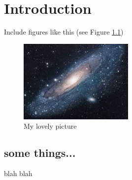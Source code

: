 \chapter{Introduction}

Include figures like this (see Figure \ref{fig:universe})

\begin{figure}
    \centering
    \includegraphics[width=0.5\textwidth]{chap1/figs/universe.jpg}
    \caption{My lovely picture}
    \label{fig:universe}
\end{figure}

\section{some things...} \label{sec:stuff}

blah blah